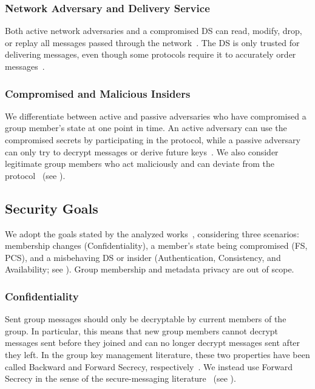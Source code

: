 \documentclass[conference]{IEEEtran}
\begin{document}
\subsubsection{Network Adversary and Delivery Service}
Both active network adversaries and a compromised \ac{DS} can read, modify, drop, or replay all messages passed through the network~\cite{beurdoucheMessagingLayerSecurity2025,weidnerKeyAgreementDecentralized2021,alwenContinuousGroupKey2020}.
The \ac{DS} is only trusted for delivering messages, even though some protocols require it to accurately order messages~\cite{beurdoucheMessagingLayerSecurity2025,weidnerKeyAgreementDecentralized2021}.
\subsubsection{Compromised and Malicious Insiders}
We differentiate between active and passive adversaries who have compromised a group member's state at one point in time.
An active adversary can use the compromised secrets by participating in the protocol, while a passive adversary can only try to decrypt messages or derive future keys~\cite{beurdoucheMessagingLayerSecurity2025,weidnerKeyAgreementDecentralized2021}.
We also consider legitimate group members who act maliciously and can deviate from the protocol~\cite{alwenInsiderSecurityMLS2022,weidnerKeyAgreementDecentralized2021} (see ).

\subsection{Security Goals}
We adopt the goals stated by the analyzed works~\cite{beurdoucheMessagingLayerSecurity2025,weidnerKeyAgreementDecentralized2021,alwenContinuousGroupKey2020}, considering three scenarios: membership changes (Confidentiality), a member's state being compromised (\ac{FS}, \ac{PCS}), and a misbehaving DS or insider (Authentication, Consistency, and Availability; see ).
Group membership and metadata privacy are out of scope.

\subsubsection{Confidentiality}
Sent group messages should only be decryptable by current members of the group.
In particular, this means that new group members cannot decrypt messages sent before they joined and can no longer decrypt messages sent after they left.
In the group key management literature, these two properties have been called Backward and Forward Secrecy, respectively~\cite{kimTreebasedGroupKey2004,prantlSurveySecureGroup2022}.
We instead use Forward Secrecy in the sense of the secure-messaging literature~\cite{barnesMessagingLayerSecurity2023,weidnerKeyAgreementDecentralized2021} (see ).
\end{document}
